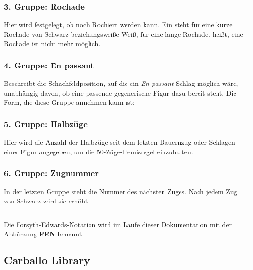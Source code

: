 \subsubsection{3. Gruppe: Rochade}


Hier wird festgelegt, ob noch Rochiert werden kann. Ein  steht für
eine kurze Rochade von Schwarz beziehungsweiße Weiß,  für eine lange
Rochade. \code{-} heißt, eine Rochade ist nicht mehr möglich.

\subsubsection{4. Gruppe: En passant}

\code{-}

Beschreibt die Schachfeldposition, auf die ein \emph{En passant}-Schlag möglich
wäre, unabhängig davon, ob eine passende gegenerische Figur dazu bereit steht.
Die Form, die diese Gruppe annehmen kann ist:\\ 

\subsubsection{5. Gruppe: Halbzüge}


Hier wird die Anzahl der Halbzüge seit dem letzten Bauernzug oder Schlagen einer
Figur angegeben, um die 50-Züge-Remisregel einzuhalten.

\subsubsection{6. Gruppe: Zugnummer}


In der letzten Gruppe steht die Nummer des nächsten Zuges. Nach jedem Zug von
Schwarz wird sie erhöht.

\rule{\textwidth}{0.5pt}

Die Forsyth-Edwards-Notation wird im Laufe dieser Dokumentation mit der
Abkürzung \textbf{FEN} benannt.

\subsection{Carballo Library}
\subsectionauthor{\oliver}

